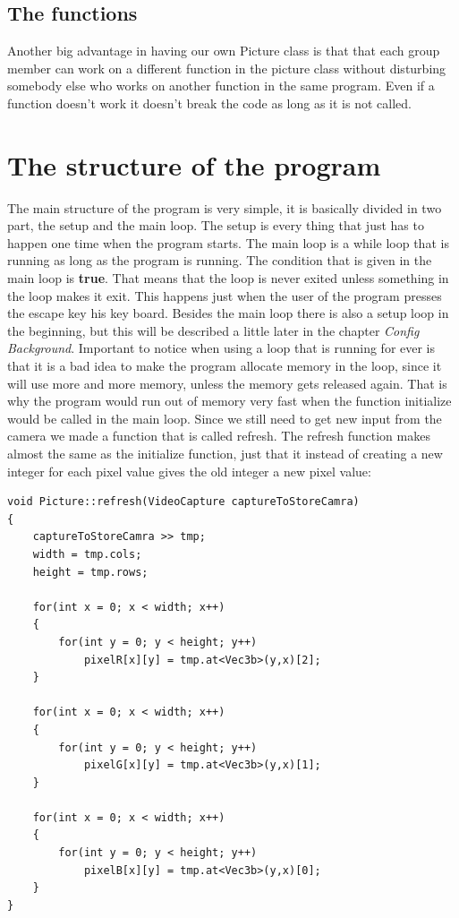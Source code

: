 \subsection{The functions}
Another big advantage in having our own Picture class is that that each group member can work on a different function in the picture class without disturbing somebody else who works on another function in the same program. Even if a function doesn't work it doesn't break the code as long as it is not called. 

\section{The structure of the program}

The main structure of the program is very simple, it is basically divided in two part, the setup and the main loop. The setup is every thing that just has to happen one time when the program starts. The main loop is a while loop that is running as long as the program is running. The condition that is given in the main loop is \textbf{true}. That means that the loop is never exited unless something in the loop makes it exit. This happens just when the user of the program presses the escape key his key board.
Besides the main loop there is also a setup loop in the beginning, but this will be described a little later in the chapter \textit{Config Background}. 
Important to notice when using a loop that is running for ever is that it is a bad idea to make the program allocate memory in the loop, since it will use more and more memory, unless the memory gets released again. That is why the program would run out of memory very fast when the function initialize would be called in the main loop. Since we still need to get new input from the camera we made a function that is called refresh. The refresh function makes almost the same as the initialize function, just that it instead of creating a new integer for each pixel value gives the old integer a new pixel value:

\begin{lstlisting}
void Picture::refresh(VideoCapture captureToStoreCamra)
{
	captureToStoreCamra >> tmp;
	width = tmp.cols;
	height = tmp.rows;

	for(int x = 0; x < width; x++)
	{
		for(int y = 0; y < height; y++)
			pixelR[x][y] = tmp.at<Vec3b>(y,x)[2];
	}

	for(int x = 0; x < width; x++)
	{
		for(int y = 0; y < height; y++)
			pixelG[x][y] = tmp.at<Vec3b>(y,x)[1];
	}

	for(int x = 0; x < width; x++)
	{
		for(int y = 0; y < height; y++)
			pixelB[x][y] = tmp.at<Vec3b>(y,x)[0];
	}
}
\end{lstlisting}

